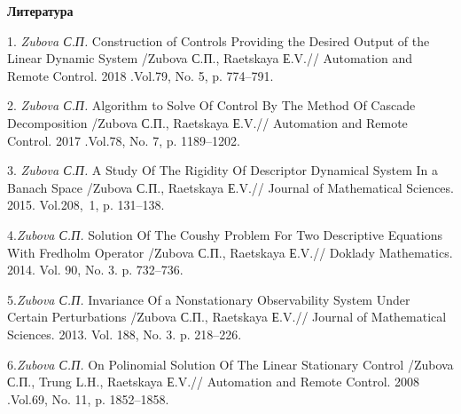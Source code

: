 \smallskip \centerline {\bf Литература} \nopagebreak


1. {\it  Zubova С.П.} Construction of Controls Providing the Desired Output of the Linear Dynamic System /Zubova С.П., Raetskaya Е.V.// Automation and Remote Control. 2018 .Vol.79, No. 5, p. 774--791.

2. {\it  Zubova С.П.}  Algorithm to Solve Of Control By The Method Of Cascade Decomposition /Zubova С.П., Raetskaya Е.V.// Automation and Remote Control. 2017 .Vol.78, No. 7, p. 1189--1202.

3. {\it  Zubova С.П.} A Study Of The Rigidity Of Descriptor Dynamical System In a Banach Space /Zubova С.П., Raetskaya Е.V.// Journal of Mathematical Sciences. 2015. Vol.208, 1, p. 131--138.


4.{\it  Zubova С.П.} Solution Of The Coushy Problem For Two Descriptive Equations With Fredholm Operator /Zubova С.П., Raetskaya Е.V.//
Doklady Mathematics. 2014.  Vol. 90, No. 3.  p. 732--736.

5.{\it  Zubova С.П.}  Invariance Of a Nonstationary  Observability System Under Certain Perturbations /Zubova С.П., Raetskaya Е.V.// Journal of Mathematical Sciences. 2013.  Vol.  188, No. 3. p. 218--226.

6.{\it  Zubova С.П.} On Polinomial  Solution Of The Linear Stationary Control /Zubova С.П., Trung L.H., Raetskaya Е.V.// Automation and Remote Control. 2008 .Vol.69, No. 11, p. 1852--1858.
